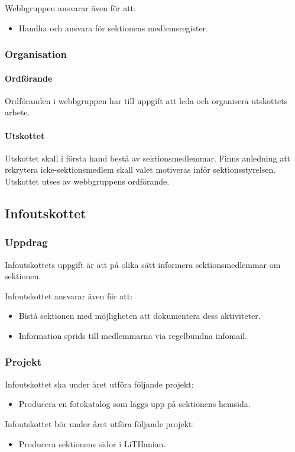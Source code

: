 \documentclass{datateknologsektionen-document}
\begin{document}
Webbgruppen ansvarar även för att:
\begin{itemize}
  \item Handha och ansvara för sektionens medlemsregister.
\end{itemize}

\subsubsection{Organisation}
\paragraph{Ordförande}
Ordföranden i webbgruppen har till uppgift att leda och organisera utskottets arbete.

\paragraph{Utskottet}
Utskottet skall i första hand bestå av sektionsmedlemmar. Finns anledning att rekrytera icke-sektionsmedlem skall valet motiveras inför sektionsstyrelsen. Utskottet utses av
webbgruppens ordförande.

\subsection{Infoutskottet}
\label{info}
\subsubsection{Uppdrag}
Infoutskottets uppgift är att på olika sätt informera sektionsmedlemmar om sektionen.

Infoutskottet ansvarar även för att:
\begin{itemize}
  \item Bistå sektionen med möjligheten att dokumentera dess aktiviteter.
  \item Information sprids till medlemmarna via regelbundna infomail.
\end{itemize}

\subsubsection{Projekt}
Infoutskottet ska under året utföra följande projekt:
\begin{itemize}
  \item Producera en fotokatalog som läggs upp på sektionens hemsida.
\end{itemize}
Infoutskottet bör under året utföra följande projekt:
\begin{itemize}
  \item Producera sektionens sidor i LiTHanian.
\end{itemize}
\end{document}
